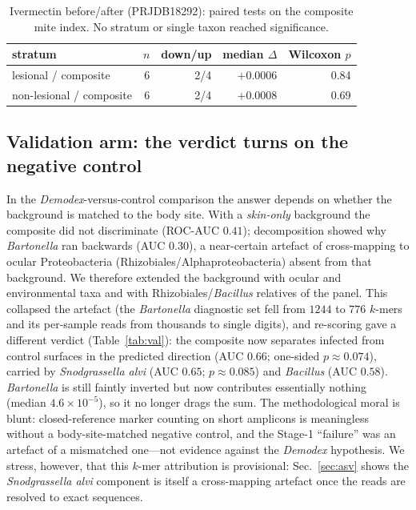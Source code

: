 \documentclass[11pt]{article}
\newcommand{\salvi}{\textit{Snodgrassella alvi}}
\newcommand{\demodex}{\textit{Demodex}}
\begin{document}
\begin{table}[t]
\centering
\small
\begin{tabular}{lrrrr}
\toprule
stratum & $n$ & down/up & median $\Delta$ & Wilcoxon $p$ \\
\midrule
lesional / composite     & 6 & 2/4 & $+0.0006$ & 0.84 \\
non-lesional / composite & 6 & 2/4 & $+0.0008$ & 0.69 \\
\bottomrule
\end{tabular}
\caption{Ivermectin before/after (PRJDB18292): paired tests on the composite
mite index. No stratum or single taxon reached significance.}
\label{tab:treat}
\end{table}

\subsection{Validation arm: the verdict turns on the negative control}
In the \demodex-versus-control comparison the answer depends on whether the
background is matched to the body site. With a \emph{skin-only} background the
composite did not discriminate (ROC-AUC $0.41$); decomposition showed why
\textit{Bartonella} ran backwards (AUC $0.30$), a near-certain artefact of
cross-mapping to ocular Proteobacteria (Rhizobiales/Alphaproteobacteria) absent
from that background. We therefore extended the background with ocular and
environmental taxa and with Rhizobiales/\textit{Bacillus} relatives of the panel.
This collapsed the artefact (the \textit{Bartonella} diagnostic set fell from
$1244$ to $776$ $k$-mers and its per-sample reads from thousands to single
digits), and re-scoring gave a different verdict (Table~\ref{tab:val}): the
composite now separates infected from control surfaces in the predicted direction
(AUC $0.66$; one-sided $p \approx 0.074$), carried by \salvi{} (AUC $0.65$;
$p \approx 0.085$) and \textit{Bacillus} (AUC $0.58$). \textit{Bartonella} is
still faintly inverted but now contributes essentially nothing (median
$4.6\times10^{-5}$), so it no longer drags the sum. The methodological moral is
blunt: closed-reference marker counting on short amplicons is meaningless
without a body-site-matched negative control, and the Stage-1 ``failure'' was an
artefact of a mismatched one---not evidence against the \demodex{} hypothesis.
We stress, however, that this $k$-mer attribution is provisional: Sec.~\ref{sec:asv}
shows the \salvi{} component is itself a cross-mapping artefact once the reads are
resolved to exact sequences.
\end{document}
